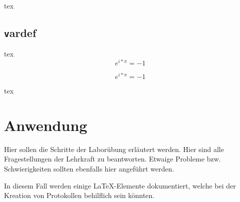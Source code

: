 \begin{listing}
\begin{code}{tex}
\end{code}
\caption{\texttt makefig}
\label{lst:makefig}
\end{listing}

\subsection{\texttt vardef}
\begin{listing}
\begin{code}{tex}
$$e^{i*\pi} = -1$$
\end{code}

$$e^{i*\pi} = -1$$

\begin{code}[firstnumber=last]{tex}
\begin{vardef}
\end{vardef}
\end{code}

\begin{vardef}
\end{vardef}

\caption{\texttt vardef}
\label{lst:vardef}
\end{listing}

\newpage
\section{Anwendung}\label{sec:Anwendung}
Hier sollen die Schritte der Laborübung erläutert werden. Hier sind alle Fragestellungen der Lehrkraft zu beantworten. Etwaige Probleme bzw. Schwierigkeiten sollten ebenfalls hier angeführt werden.

In diesem Fall werden einige \LaTeX-Elemente dokumentiert, welche bei der Kreation von Protokollen behilflich sein könnten.

